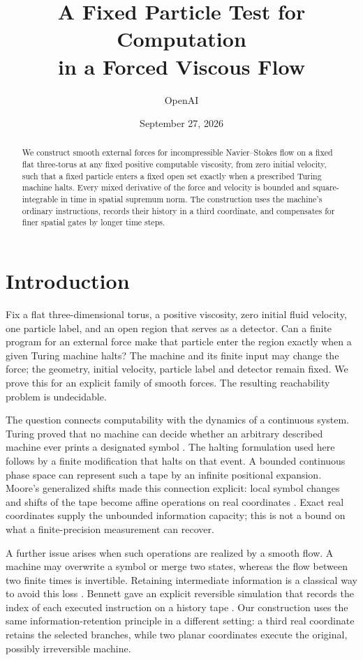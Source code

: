 \documentclass[11pt]{article}
\title{A Fixed Particle Test for Computation\\ in a Forced Viscous Flow}
\author{OpenAI}
\date{September 27, 2026}
\begin{document}
\maketitle
\begin{abstract}
We construct smooth external forces for incompressible Navier--Stokes flow
on a fixed flat three-torus at any fixed positive computable viscosity,
from zero initial velocity, such that a fixed
particle enters a fixed open set exactly when a prescribed Turing machine
halts. Every mixed derivative of the force and velocity is bounded and
square-integrable in time in spatial supremum norm. The construction uses
the machine's ordinary instructions, records their history in a third
coordinate, and compensates for finer spatial gates by longer time steps.
\end{abstract}

\section{Introduction}\label{sec:introduction}

Fix a flat three-dimensional torus, a positive viscosity, zero initial
fluid velocity, one particle label, and an open region that serves as a
detector. Can a finite program for an external force make that particle
enter the region exactly when a given Turing machine halts? The machine
and its finite input may change the force; the geometry, initial velocity,
particle label and detector remain fixed. We prove this for an explicit
family of smooth forces. The resulting reachability problem is undecidable.

The question connects computability with the dynamics of a continuous
system. Turing proved that no machine can decide whether an arbitrary
described machine ever prints a designated symbol \cite[Section~8]{Turing}.
The halting formulation used here follows by a finite modification
that halts on that event. A bounded
continuous phase space can represent such a tape by an infinite positional
expansion. Moore's generalized shifts made this connection explicit:
local symbol changes and shifts of the tape become affine operations on
real coordinates \cite{Moore1990,Moore}. Exact real coordinates supply the unbounded
information capacity; this is not a bound on what a finite-precision
measurement can recover.

A further issue arises when such operations are realized by a smooth
flow. A machine may overwrite a symbol or merge two states, whereas the
flow between two finite times is invertible. Retaining intermediate
information is a classical way to avoid this loss \cite[Section~3]{Landauer}.
Bennett gave an explicit reversible simulation that records the index of
each executed instruction on a history tape \cite[Eqs.~(9)--(11)]{Bennett}. Our construction
uses the same information-retention principle in a different setting:
a third real coordinate retains the selected branches, while two planar
coordinates execute the original, possibly irreversible machine.
\end{document}
